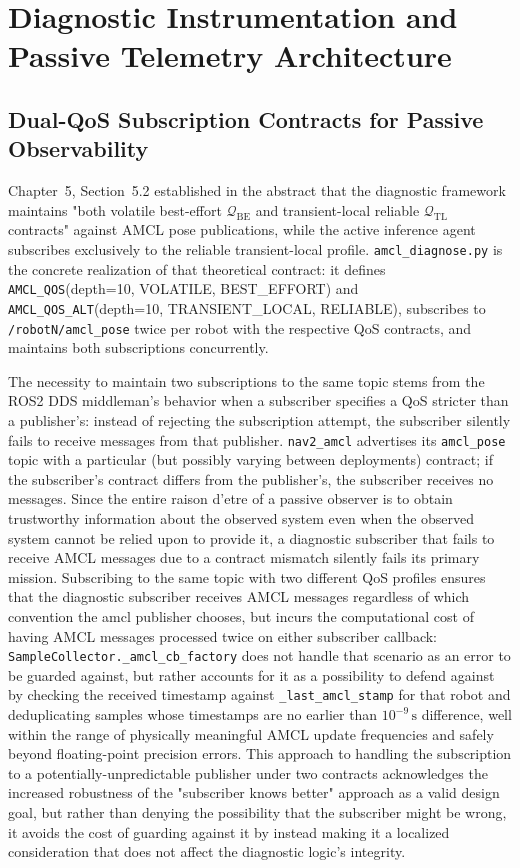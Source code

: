 \section{Diagnostic Instrumentation and Passive Telemetry Architecture}

\subsection{Dual-QoS Subscription Contracts for Passive Observability}

Chapter~5, Section~5.2 established in the abstract that the diagnostic framework maintains "both volatile best-effort $\mathcal{Q}_{\text{BE}}$ and transient-local reliable $\mathcal{Q}_{\text{TL}}$ contracts" against AMCL pose publications, while the active inference agent subscribes exclusively to the reliable transient-local profile. \texttt{amcl\_diagnose.py} is the concrete realization of that theoretical contract: it defines \texttt{AMCL\_QOS}(depth=10, VOLATILE, BEST\-\_EFFORT) and \texttt{AMCL\_QOS\_ALT}(depth=10, TRANSIENT\_LOCAL, RELIABLE), subscribes to \texttt{/robotN/\-amcl\_pose} twice per robot with the respective QoS contracts, and maintains both subscriptions concurrently.

The necessity to maintain two subscriptions to the same topic stems from the ROS2 DDS middleman's behavior when a subscriber specifies a QoS stricter than a publisher's: instead of rejecting the subscription attempt, the subscriber silently fails to receive messages from that publisher. \texttt{nav2\_amcl} advertises its \texttt{amcl\_pose} topic with a particular (but possibly varying between deployments) contract; if the subscriber's contract differs from the publisher's, the subscriber receives no messages. Since the entire raison d'etre of a passive observer is to obtain trustworthy information about the observed system even when the observed system cannot be relied upon to provide it, a diagnostic subscriber that fails to receive AMCL messages due to a contract mismatch silently fails its primary mission. Subscribing to the same topic with two different QoS profiles ensures that the diagnostic subscriber receives AMCL messages regardless of which convention the amcl publisher chooses, but incurs the computational cost of having AMCL messages processed twice on either subscriber callback: \texttt{SampleCollector.\_amcl\_cb\_factory} does not handle that scenario as an error to be guarded against, but rather accounts for it as a possibility to defend against by checking the received timestamp against \texttt{\_last\_amcl\_stamp} for that robot and deduplicating samples whose timestamps are no earlier than $10^{-9}\,\text{s}$ difference, well within the range of physically meaningful AMCL update frequencies and safely beyond floating-point precision errors. This approach to handling the subscription to a potentially-unpredictable publisher under two contracts acknowledges the increased robustness of the "subscriber knows better" approach as a valid design goal, but rather than denying the possibility that the subscriber might be wrong, it avoids the cost of guarding against it by instead making it a localized consideration that does not affect the diagnostic logic's integrity.

